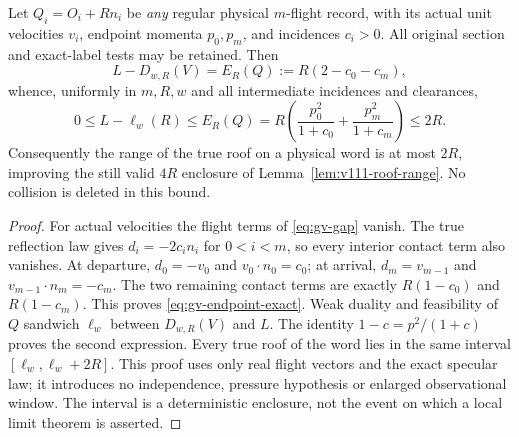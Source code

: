 \begin{theorem}
\label{thm:gv-endpoint}
Let $Q_i=O_i+Rn_i$ be \emph{any} regular physical $m$-flight record,
with its actual unit velocities $v_i$, endpoint momenta $p_0,p_m$,
and incidences $c_i>0$. All original section and exact-label tests
may be retained. Then
\begin{equation}\label{eq:gv-endpoint-exact}
 L-D_{w,R}(V)=E_R(Q):=R(2-c_0-c_m),
\end{equation}
whence, uniformly in $m,R,w$ and all intermediate incidences and clearances,
\begin{equation}\label{eq:gv-endpoint-bound}
 0\le L-\ell_w(R)\le E_R(Q)
 =R\left(\frac{p_0^2}{1+c_0}+\frac{p_m^2}{1+c_m}\right)\le2R.
\end{equation}
Consequently the range of the true roof on a physical word is at most
$2R$, improving the still valid $4R$ enclosure of
Lemma~\ref{lem:v111-roof-range}. No collision is deleted in this bound.
\end{theorem}
\begin{proof}
For actual velocities the flight terms of \eqref{eq:gv-gap} vanish.
The true reflection law gives $d_i=-2c_i n_i$ for $0<i<m$,
so every interior contact term also vanishes. At departure,
$d_0=-v_0$ and $v_0\cdot n_0=c_0$; at arrival,
$d_m=v_{m-1}$ and $v_{m-1}\cdot n_m=-c_m$.
The two remaining contact terms are exactly $R(1-c_0)$ and
$R(1-c_m)$. This proves \eqref{eq:gv-endpoint-exact}.
Weak duality and feasibility of $Q$ sandwich $\ell_w$ between
$D_{w,R}(V)$ and $L$. The identity
$1-c=p^2/(1+c)$ proves the second expression. Every true roof of
the word lies in the same interval $[\ell_w,\ell_w+2R]$.
This proof uses only real flight vectors and the exact specular law;
it introduces no independence, pressure hypothesis or enlarged
observational window. The interval is a deterministic enclosure,
not the event on which a local limit theorem is asserted.
\end{proof}

